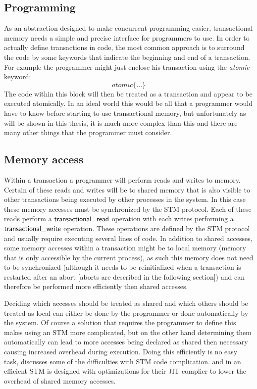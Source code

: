 \subsection{Programming}
As an abstraction designed to make concurrent programming easier, transactional memory needs a
simple and precise interface for programmers to use.
In order to actually define transactions in code, the most common
approach is to surround the code by some keywords that indicate the beginning and end of a transaction.
For example the programmer might just enclose his transaction using the \emph{atomic} keyword:
$$atomic\{\ldots\}$$
The code within this block will then be treated as a transaction and appear to be executed atomically.
In an ideal world this would be all that a programmer would have to know before starting to use
transactional memory, but unfortunately as will be shown in this thesis, it is much more complex than this
and there are many other things that the programmer must consider.


\subsection{Memory access}
Within a transaction a programmer will perform reads and writes to memory.
Certain of these reads and writes will be to shared memory that is also visible to other transactions
being executed by other processes in the system.
In this case these memory accesses must be synchronized by the STM protocol.
Each of these reads perform a $\lit{transactional\_read}$ operation with each writes performing a $\lit{transactional\_write}$ operation.
These operations are defined by the STM protocol and usually require executing several lines of code.
In addition to shared accesses, some memory accesses within a transaction might be to local memory
(memory that is only accessible by the current process),
as such this memory does not need to be synchronized (although it needs to be reinitialized when a transaction is
restarted after an abort [aborts are described in the following section]) and can therefore be performed more efficiently then shared accesses.

Deciding which accesses should be treated as shared and which others should be treated as local
can either be done by the programmer or done automatically by the system.
Of course a solution that requires the programmer to define this makes using an STM more complicated, but on
the other hand determining them automatically can lead to more accesses being declared as shared then necessary
causing increased overhead during execution.
Doing this efficiently is no easy task, \cite{DFGG11} discusses some of the difficulties with STM code complication.
and in \cite{1133985} an efficient STM is designed with optimizations for their JIT complier to lower the overhead
of shared memory accesses.

